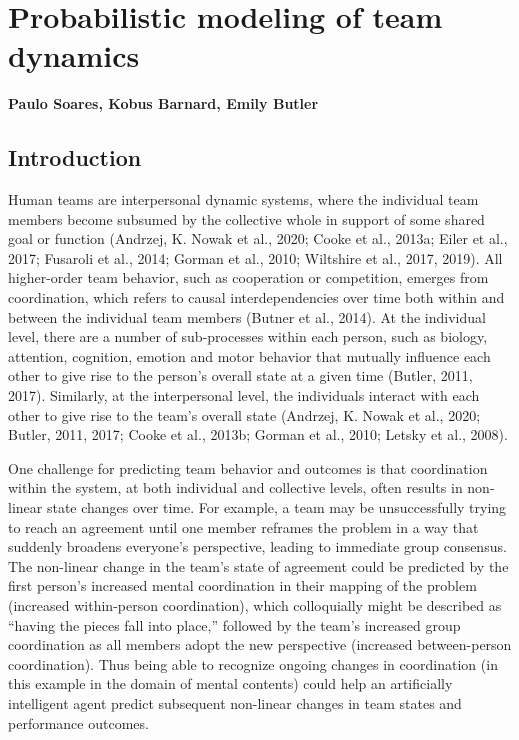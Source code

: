 \chapter{Probabilistic modeling of team dynamics}
\label{ch:pgm}
\textbf{Paulo Soares, Kobus Barnard, Emily Butler}

\section{Introduction}
Human teams are interpersonal dynamic systems, where the individual team members
become subsumed by the collective whole in support of some shared goal or
function (Andrzej, K. Nowak et al., 2020; Cooke et al., 2013a; Eiler et al.,
2017; Fusaroli et al., 2014; Gorman et al., 2010; Wiltshire et al., 2017, 2019).
All higher-order team behavior, such as cooperation or competition, emerges from
coordination, which refers to causal interdependencies over time both within and
between the individual team members (Butner et al., 2014). At the individual
level, there are a number of sub-processes within each person, such as biology,
attention, cognition, emotion and motor behavior that mutually influence each
other to give rise to the person’s overall state at a given time (Butler, 2011,
2017). Similarly, at the interpersonal level, the individuals interact with each
other to give rise to the team’s overall state (Andrzej, K. Nowak et al., 2020;
Butler, 2011, 2017; Cooke et al., 2013b; Gorman et al., 2010; Letsky et al.,
2008).

One challenge for predicting team behavior and outcomes is that coordination
within the system, at both individual and collective levels, often results in
non-linear state changes over time. For example, a team may be unsuccessfully
trying to reach an agreement until one member reframes the problem in a way that
suddenly broadens everyone’s perspective, leading to immediate group consensus.
The non-linear change in the team’s state of agreement could be predicted by the
first person’s increased mental coordination in their mapping of the problem
(increased within-person coordination), which colloquially might be described as
“having the pieces fall into place,” followed by the team’s increased group
coordination as all members adopt the new perspective (increased between-person
coordination). Thus being able to recognize ongoing changes in coordination (in
this example in the domain of mental contents) could help an artificially
intelligent agent predict subsequent non-linear changes in team states and
performance outcomes. 

